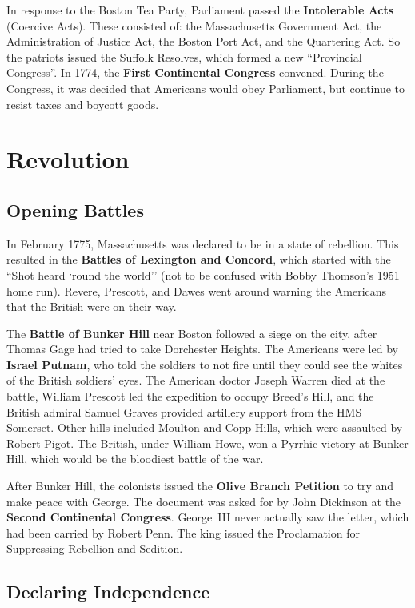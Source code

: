 In response to the Boston Tea Party, Parliament passed the \textbf{Intolerable Acts} (Coercive Acts).
These consisted of:
the Massachusetts Government Act,
the Administration of Justice Act,
the Boston Port Act,
and the Quartering Act.
So the patriots issued the Suffolk Resolves, which formed a new ``Provincial Congress''.
In 1774, the \textbf{First Continental Congress} convened.
During the Congress, it was decided that Americans would obey Parliament,
but continue to resist taxes and boycott goods.

\section{Revolution}

\subsection*{Opening Battles}

In February 1775, Massachusetts was declared to be in a state of rebellion.
This resulted in the \textbf{Battles of Lexington and Concord},
which started with the ``Shot heard `round the world''
(not to be confused with Bobby Thomson's 1951 home run).
Revere, Prescott, and Dawes went around warning the Americans that the British were on their way.

The \textbf{Battle of Bunker Hill} near Boston followed a siege on the city,
after Thomas Gage had tried to take Dorchester Heights.
The Americans were led by \textbf{Israel Putnam}, who told the soldiers to
not fire until they could see the whites of the British soldiers' eyes.
The American doctor Joseph Warren died at the battle,
William Prescott led the expedition to occupy Breed's Hill,
and the British admiral Samuel Graves provided artillery support from the HMS Somerset.
Other hills included Moulton and Copp Hills, which were assaulted by Robert Pigot.
The British, under William Howe, won a Pyrrhic victory at Bunker Hill,
which would be the bloodiest battle of the war.

After Bunker Hill, the colonists issued the \textbf{Olive Branch Petition}
to try and make peace with George.
The document was asked for by John Dickinson at the \textbf{Second Continental Congress}.
George~III never actually saw the letter, which had been carried by Robert Penn.
The king issued the Proclamation for Suppressing Rebellion and Sedition.

\subsection*{Declaring Independence}

